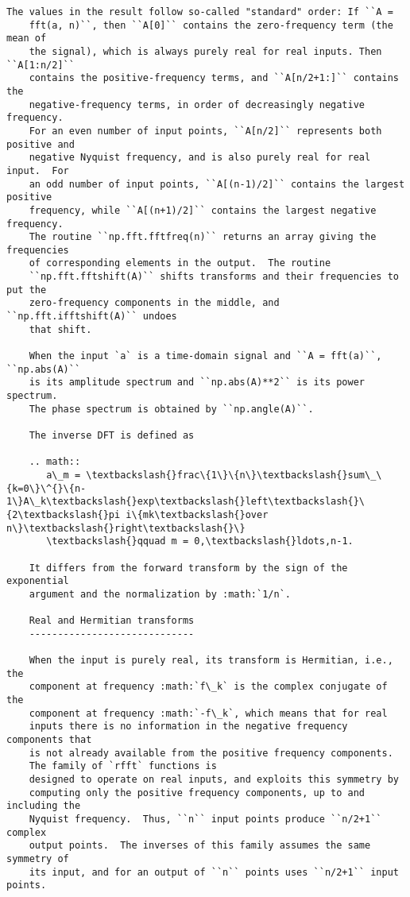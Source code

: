 \documentclass{article}
\begin{document}
\begin{Verbatim}[commandchars=\\\{\}]
    The values in the result follow so-called "standard" order: If ``A =
    fft(a, n)``, then ``A[0]`` contains the zero-frequency term (the mean of
    the signal), which is always purely real for real inputs. Then ``A[1:n/2]``
    contains the positive-frequency terms, and ``A[n/2+1:]`` contains the
    negative-frequency terms, in order of decreasingly negative frequency.
    For an even number of input points, ``A[n/2]`` represents both positive and
    negative Nyquist frequency, and is also purely real for real input.  For
    an odd number of input points, ``A[(n-1)/2]`` contains the largest positive
    frequency, while ``A[(n+1)/2]`` contains the largest negative frequency.
    The routine ``np.fft.fftfreq(n)`` returns an array giving the frequencies
    of corresponding elements in the output.  The routine
    ``np.fft.fftshift(A)`` shifts transforms and their frequencies to put the
    zero-frequency components in the middle, and ``np.fft.ifftshift(A)`` undoes
    that shift.
    
    When the input `a` is a time-domain signal and ``A = fft(a)``, ``np.abs(A)``
    is its amplitude spectrum and ``np.abs(A)**2`` is its power spectrum.
    The phase spectrum is obtained by ``np.angle(A)``.
    
    The inverse DFT is defined as
    
    .. math::
       a\_m = \textbackslash{}frac\{1\}\{n\}\textbackslash{}sum\_\{k=0\}\^{}\{n-1\}A\_k\textbackslash{}exp\textbackslash{}left\textbackslash{}\{2\textbackslash{}pi i\{mk\textbackslash{}over n\}\textbackslash{}right\textbackslash{}\}
       \textbackslash{}qquad m = 0,\textbackslash{}ldots,n-1.
    
    It differs from the forward transform by the sign of the exponential
    argument and the normalization by :math:`1/n`.
    
    Real and Hermitian transforms
    -----------------------------
    
    When the input is purely real, its transform is Hermitian, i.e., the
    component at frequency :math:`f\_k` is the complex conjugate of the
    component at frequency :math:`-f\_k`, which means that for real
    inputs there is no information in the negative frequency components that
    is not already available from the positive frequency components.
    The family of `rfft` functions is
    designed to operate on real inputs, and exploits this symmetry by
    computing only the positive frequency components, up to and including the
    Nyquist frequency.  Thus, ``n`` input points produce ``n/2+1`` complex
    output points.  The inverses of this family assumes the same symmetry of
    its input, and for an output of ``n`` points uses ``n/2+1`` input points.
    

\end{Verbatim}
\end{document}
